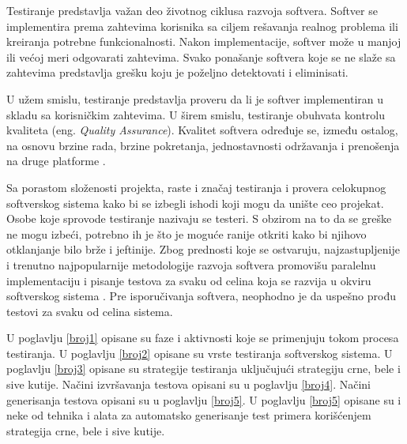 \documentclass[12pt,oneside]{memoir}
\begin{document}
Testiranje predstavlja važan deo životnog ciklusa razvoja softvera. 
Softver se implementira prema zahtevima korisnika sa ciljem rešavanja realnog problema ili kreiranja potrebne funkcionalnosti. Nakon implementacije, softver može u manjoj ili većoj meri odgovarati zahtevima. Svako ponašanje softvera koje se ne slaže sa zahtevima predstavlja grešku koju je poželjno detektovati i eliminisati. 
\par
U užem smislu, testiranje predstavlja proveru da li je softver implementiran u skladu sa korisničkim zahtevima. U širem smislu, testiranje obuhvata kontrolu kvaliteta (eng. \textit{Quality Assurance}). Kvalitet softvera određuje se, između ostalog, na osnovu brzine rada, brzine pokretanja, jednostavnosti održavanja i prenošenja na druge platforme \cite{QualityAssurance}.
\par 
Sa porastom složenosti projekta, raste i značaj testiranja i provera celokupnog softverskog sistema kako bi se izbegli ishodi koji mogu da unište ceo projekat. Osobe koje sprovode testiranje nazivaju se testeri. S obzirom na to da se greške ne mogu izbeći, potrebno ih je što je moguće ranije otkriti kako bi njihovo otklanjanje bilo brže i jeftinije. Zbog prednosti koje se ostvaruju, najzastupljenije i trenutno najpopularnije metodologije razvoja softvera promovišu paralelnu implementaciju i pisanje testova za svaku od celina koja se razvija u okviru softverskog sistema \cite{AgileDevelopment}. Pre isporučivanja softvera, neophodno je da uspešno prođu testovi za svaku od celina sistema.
\par 

U poglavlju \ref{broj1} opisane su faze i aktivnosti koje se primenjuju tokom procesa testiranja. U poglavlju \ref{broj2} opisane su vrste testiranja softverskog sistema. U poglavlju \ref{broj3} opisane su strategije testiranja uključujući strategiju crne, bele i sive kutije. Načini izvršavanja testova opisani su u poglavlju \ref{broj4}. Načini generisanja testova opisani su u poglavlju \ref{broj5}. U poglavlju \ref{broj5} opisane su i neke od tehnika i alata za automatsko generisanje test primera korišćenjem strategija crne, bele i sive kutije. 
\end{document}
